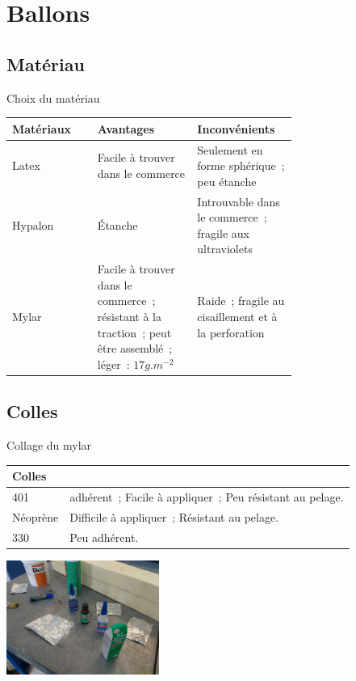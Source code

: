 \documentclass{beamer}
\begin{document}
\section{Ballons}

\subsection{Matériau}

\begin{frame}{Choix du matériau}
	\begin{tabular}{|l|p{0.35\linewidth}|p{0.35\linewidth}|}
		\hline
		Matériaux & Avantages & Inconvénients \\
		\hline

		Latex &
		Facile à trouver dans le commerce &
		Seulement en forme sphérique~; peu étanche \\
		\hline

		Hypalon & Étanche & Introuvable dans le commerce~; fragile aux ultraviolets \\
		\hline

		Mylar &
		Facile à trouver dans le commerce~; résistant à la traction~; peut être assemblé~; léger~: $17 g.m^{-2}$ &
		Raide~; fragile au cisaillement et à la perforation\\
		\hline
	\end{tabular}
\end{frame}

\subsection{Colles}

\begin{frame}{Collage du mylar}
	\begin{tabular}{|l|l|}
		\hline
		Colles & \\
		\hline
		401 & adhérent~; Facile à appliquer~; Peu résistant au pelage. \\
		\hline
		Néoprène & Difficile à appliquer~; Résistant au pelage. \\
		\hline
		330 & Peu adhérent. \\
		\hline
 \end{tabular}

 \begin{center}
		\includegraphics[width=5cm]{../Images/test_colle.jpg}
 \end{center}
\end{frame}
\end{document}
